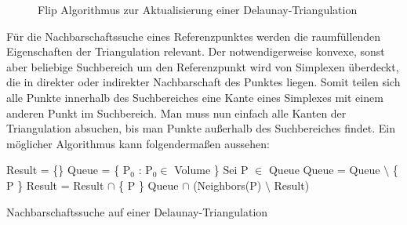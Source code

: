 \begin{figure}[bhpt]
  \caption{Flip Algorithmus zur Aktualisierung einer Delaunay-Triangulation}
  \label{fig:delaunay-flip}
\end{figure}


Für die Nachbarschaftssuche eines Referenzpunktes werden die raumfüllenden Eigenschaften der Triangulation relevant.
Der notwendigerweise konvexe, sonst aber beliebige Suchbereich um den Referenzpunkt wird von Simplexen überdeckt, die in direkter oder indirekter Nachbarschaft des Punktes liegen.
Somit teilen sich alle Punkte innerhalb des Suchbereiches eine Kante eines Simplexes mit einem anderen Punkt im Suchbereich.
Man muss nun einfach alle Kanten der Triangulation absuchen, bis man Punkte außerhalb des Suchbereiches findet.
Ein möglicher Algorithmus kann folgendermaßen aussehen:

\begin{algorithm}
  \centering
  \begin{algorithmic}
    \STATE Result = \{\}
    \STATE Queue = \{ P$_0$ : P$_0 \in$ Volume \}
    \STATE Sei P $\in$ Queue
    \STATE Queue = Queue $\setminus$ \{ P \}
    \STATE Result = Result $\cap$ \{ P \}
    \STATE Queue $\cap$ (Neighbors(P) $\setminus$ Result)
    \ENDIF
    \ENDWHILE
  \end{algorithmic}
  \caption[Nachbarschaftssuche auf einer Delaunay-Triangulation]{Nachbarschaftssuche auf einer Delaunay-Triangulation}
  \label{algo:delaunay-neighbors}
\end{algorithm}

